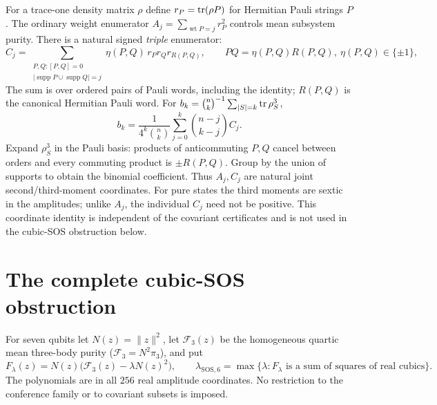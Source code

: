 \begin{remark}
For a trace-one density matrix $\rho$ define $r_P=\operatorname{tr}(\rho P)$ for Hermitian
Pauli strings $P$. The ordinary weight enumerator
$A_j=\sum_{\operatorname{wt}P=j}r_P^2$ controls mean subsystem
purity. There is a natural signed \emph{triple} enumerator:
\[
 C_j=\!\!\sum_{\substack{P,Q:[P,Q]=0\\
           |\operatorname{supp}P\cup\operatorname{supp}Q|=j}}
 \eta(P,Q)\,r_Pr_Qr_{R(P,Q)},
 \qquad PQ=\eta(P,Q)R(P,Q),\ \eta(P,Q)\in\{\pm1\},
\]
The sum is over ordered pairs of Pauli words, including the identity;
$R(P,Q)$ is the canonical Hermitian Pauli word.
For $b_k=\binom nk^{-1}\sum_{|S|=k}\operatorname{tr}\rho_S^3$,
\begin{equation}\label{eq:pauli-triple}
 b_k=\frac1{4^k\binom nk}
 \sum_{j=0}^k\binom{n-j}{k-j}C_j.
\end{equation}
Expand $\rho_S^3$ in the Pauli basis: products of
anticommuting $P,Q$ cancel between orders and every commuting
product is $\pm R(P,Q)$. Group by the union of supports to obtain
the binomial coefficient. Thus $A_j,C_j$ are natural joint
second/third-moment coordinates. For pure states the third moments are sextic in the amplitudes;
unlike $A_j$, the individual $C_j$ need not be positive. This coordinate identity is independent
of the covariant certificates and is not used in the cubic-SOS obstruction below.
\end{remark}


\section{The complete cubic-SOS obstruction}
\label{sec:sextic-all-sos}

For seven qubits let $N(z)=\|z\|^2$, let $\mathcal F_3(z)$ be the homogeneous
quartic mean three-body purity ($\mathcal F_3=N^2\pi_3$), and put
\[
 F_\lambda(z)=N(z)\bigl(\mathcal F_3(z)-\lambda N(z)^2\bigr),\qquad
 \lambda_{\mathrm{SOS},6}
 =\max\{\lambda:F_\lambda\text{ is a sum of squares of real cubics}\}.
\]
The polynomials are in all $256$ real amplitude coordinates. No
restriction to the conference family or to covariant subsets is imposed.

